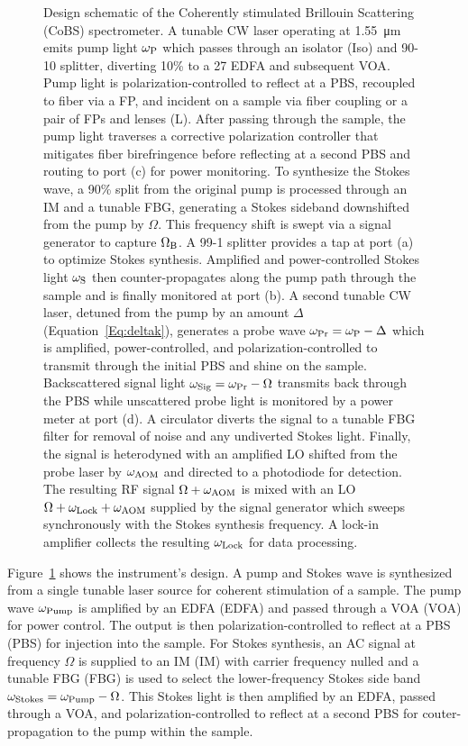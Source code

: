 \begin{figure}[htbp]
{Design schematic of the Coherently stimulated Brillouin Scattering (\acs{CoBS}) spectrometer. A tunable \ac{CW} laser operating at \SI{1.55}{\micro\meter} emits pump light \(\omega_{\rm P}\) which passes through an isolator (Iso) and 90-10 splitter, diverting 10\% to a \SI{27}{\dBm} \ac{EDFA} and subsequent \ac{VOA}. Pump light is polarization-controlled to reflect at a \ac{PBS}, recoupled to fiber via a \ac{FP}, and incident on a sample via fiber coupling or a pair of \ac{FP}s and lenses (L). After passing through the sample, the pump light traverses a corrective polarization controller that mitigates fiber birefringence before reflecting at a second \ac{PBS} and routing to port (c) for power monitoring. To synthesize the Stokes wave, a 90\% split from the original pump is processed through an \ac{IM} and a tunable \ac{FBG}, generating a Stokes sideband downshifted from the pump by \(\Omega\). This frequency shift is swept via a signal generator to capture \(\Omega_{\rm B}\). A 99-1 splitter provides a tap at port (a) to optimize Stokes synthesis. Amplified and power-controlled Stokes light \(\omega_{\rm S}\) then counter-propagates along the pump path through the sample and is finally monitored at port (b). A second tunable \ac{CW} laser, detuned from the pump by an amount \(\Delta\) (Equation~\ref{Eq:deltak}), generates a probe wave \(\omega_{\rm Pr} = \omega_{\rm P} - \Delta\) which is amplified, power-controlled, and polarization-controlled to transmit through the initial \ac{PBS} and shine on the sample. Backscattered signal light \(\omega_{\rm Sig} = \omega_{\rm Pr} - \Omega\) transmits back through the \ac{PBS} while unscattered probe light is monitored by a power meter at port (d). A circulator diverts the signal to a tunable \ac{FBG} filter for removal of noise and any undiverted Stokes light. Finally, the signal is heterodyned with an amplified \ac{LO} shifted from the probe laser by \(\omega_{\rm AOM}\) and directed to a photodiode for detection. The resulting \ac{RF} signal \(\Omega + \omega_{\rm AOM}\) is mixed with an \ac{LO} \(\Omega + \omega_{\rm Lock} + \omega_{\rm AOM}\) supplied by the signal generator which sweeps synchronously with the Stokes synthesis frequency. A lock-in amplifier collects the resulting \(\omega_{\rm Lock}\) for data processing.
}
\label{fig:Instrument Design}
\end{figure}

Figure~\ref{fig:Instrument Design} shows the instrument’s design. A pump and Stokes wave is synthesized from a single tunable laser source for coherent stimulation of a sample. The pump wave \(\omega_{\rm Pump}\) is amplified by an \acl{EDFA} (\ac{EDFA}) and passed through a \acl{VOA} (\ac{VOA}) for power control. The output is then polarization-controlled to reflect at a \acl{PBS} (\ac{PBS}) for injection into the sample. For Stokes synthesis, an \acl{AC} signal at frequency \(\Omega\) is supplied to an \acl{IM} (\ac{IM}) with carrier frequency nulled and a tunable \acl{FBG} (\ac{FBG}) is used to select the lower-frequency Stokes side band \(\omega_{\rm Stokes} = \omega_{\rm Pump} - \Omega\). This Stokes light is then amplified by an \ac{EDFA}, passed through a \ac{VOA}, and polarization-controlled to reflect at a second \ac{PBS} for couter-propagation to the pump within the sample.

